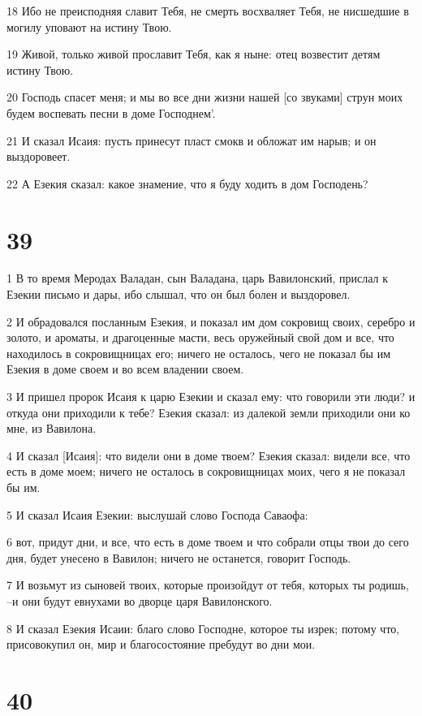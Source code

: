 \par 18 Ибо не преисподняя славит Тебя, не смерть восхваляет Тебя, не нисшедшие в могилу уповают на истину Твою.
\par 19 Живой, только живой прославит Тебя, как я ныне: отец возвестит детям истину Твою.
\par 20 Господь спасет меня; и мы во все дни жизни нашей [со звуками] струн моих будем воспевать песни в доме Господнем'.
\par 21 И сказал Исаия: пусть принесут пласт смокв и обложат им нарыв; и он выздоровеет.
\par 22 А Езекия сказал: какое знамение, что я буду ходить в дом Господень?

\chapter{39}

\par 1 В то время Меродах Валадан, сын Валадана, царь Вавилонский, прислал к Езекии письмо и дары, ибо слышал, что он был болен и выздоровел.
\par 2 И обрадовался посланным Езекия, и показал им дом сокровищ своих, серебро и золото, и ароматы, и драгоценные масти, весь оружейный свой дом и все, что находилось в сокровищницах его; ничего не осталось, чего не показал бы им Езекия в доме своем и во всем владении своем.
\par 3 И пришел пророк Исаия к царю Езекии и сказал ему: что говорили эти люди? и откуда они приходили к тебе? Езекия сказал: из далекой земли приходили они ко мне, из Вавилона.
\par 4 И сказал [Исаия]: что видели они в доме твоем? Езекия сказал: видели все, что есть в доме моем; ничего не осталось в сокровищницах моих, чего я не показал бы им.
\par 5 И сказал Исаия Езекии: выслушай слово Господа Саваофа:
\par 6 вот, придут дни, и все, что есть в доме твоем и что собрали отцы твои до сего дня, будет унесено в Вавилон; ничего не останется, говорит Господь.
\par 7 И возьмут из сыновей твоих, которые произойдут от тебя, которых ты родишь, --и они будут евнухами во дворце царя Вавилонского.
\par 8 И сказал Езекия Исаии: благо слово Господне, которое ты изрек; потому что, присовокупил он, мир и благосостояние пребудут во дни мои.

\chapter{40}

